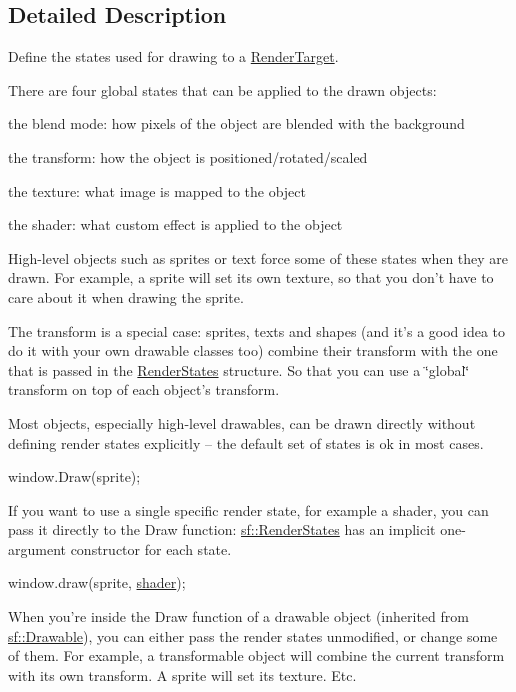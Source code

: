 \subsection{Detailed Description}
Define the states used for drawing to a \hyperlink{classsf_1_1_render_target}{Render\-Target}. 

There are four global states that can be applied to the drawn objects\-: \begin{DoxyItemize}
\item the blend mode\-: how pixels of the object are blended with the background \item the transform\-: how the object is positioned/rotated/scaled \item the texture\-: what image is mapped to the object \item the shader\-: what custom effect is applied to the object\end{DoxyItemize}
High-\/level objects such as sprites or text force some of these states when they are drawn. For example, a sprite will set its own texture, so that you don't have to care about it when drawing the sprite.

The transform is a special case\-: sprites, texts and shapes (and it's a good idea to do it with your own drawable classes too) combine their transform with the one that is passed in the \hyperlink{classsf_1_1_render_states}{Render\-States} structure. So that you can use a \char`\"{}global\char`\"{} transform on top of each object's transform.

Most objects, especially high-\/level drawables, can be drawn directly without defining render states explicitly -- the default set of states is ok in most cases. 
\begin{DoxyCode}
window.Draw(sprite);
\end{DoxyCode}


If you want to use a single specific render state, for example a shader, you can pass it directly to the Draw function\-: \hyperlink{classsf_1_1_render_states}{sf\-::\-Render\-States} has an implicit one-\/argument constructor for each state. 
\begin{DoxyCode}
window.draw(sprite, \hyperlink{classsf_1_1_render_states_a30e00c9f28ca246ae73119975255ebd0}{shader});
\end{DoxyCode}


When you're inside the Draw function of a drawable object (inherited from \hyperlink{classsf_1_1_drawable}{sf\-::\-Drawable}), you can either pass the render states unmodified, or change some of them. For example, a transformable object will combine the current transform with its own transform. A sprite will set its texture. Etc.

